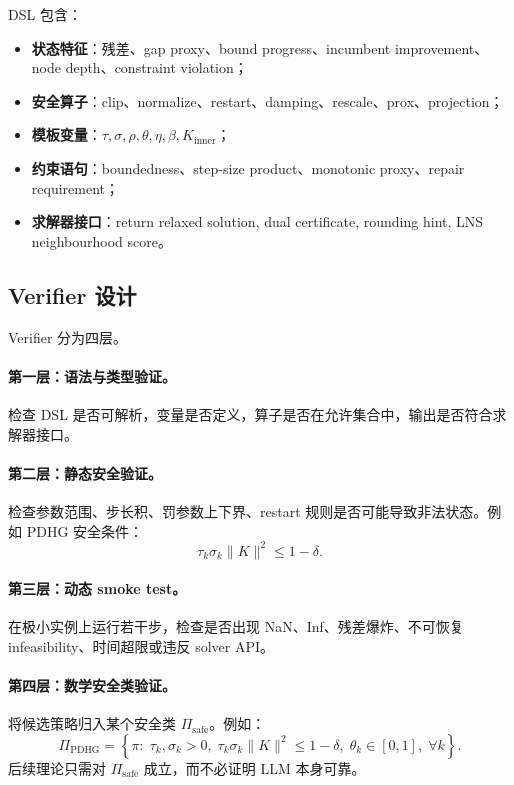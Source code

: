 \documentclass[UTF8,a4paper,12pt,fontset=fandol]{ctexart}
\begin{document}
DSL 包含：
\begin{itemize}[leftmargin=2em]
    \item \textbf{状态特征}：残差、gap proxy、bound progress、incumbent improvement、node depth、constraint violation；
    \item \textbf{安全算子}：clip、normalize、restart、damping、rescale、prox、projection；
    \item \textbf{模板变量}：$\tau,\sigma,\rho,\theta,\eta,\beta,K_{\text{inner}}$；
    \item \textbf{约束语句}：boundedness、step-size product、monotonic proxy、repair requirement；
    \item \textbf{求解器接口}：return relaxed solution, dual certificate, rounding hint, LNS neighbourhood score。
\end{itemize}

\subsection{Verifier 设计}

Verifier 分为四层。

\paragraph{第一层：语法与类型验证。}
检查 DSL 是否可解析，变量是否定义，算子是否在允许集合中，输出是否符合求解器接口。

\paragraph{第二层：静态安全验证。}
检查参数范围、步长积、罚参数上下界、restart 规则是否可能导致非法状态。例如 PDHG 安全条件：
\begin{equation}
\tau_k\sigma_k\|K\|^2 \le 1-\delta.
\end{equation}

\paragraph{第三层：动态 smoke test。}
在极小实例上运行若干步，检查是否出现 NaN、Inf、残差爆炸、不可恢复 infeasibility、时间超限或违反 solver API。

\paragraph{第四层：数学安全类验证。}
将候选策略归入某个安全类 $\Pi_{\text{safe}}$。例如：
\begin{equation}
\Pi_{\text{PDHG}} =
\left\{
\pi:\;
\tau_k,\sigma_k>0,\;
\tau_k\sigma_k\|K\|^2\le 1-\delta,\;
\theta_k\in[0,1],\;
\forall k
\right\}.
\end{equation}
后续理论只需对 $\Pi_{\text{safe}}$ 成立，而不必证明 LLM 本身可靠。
\end{document}
